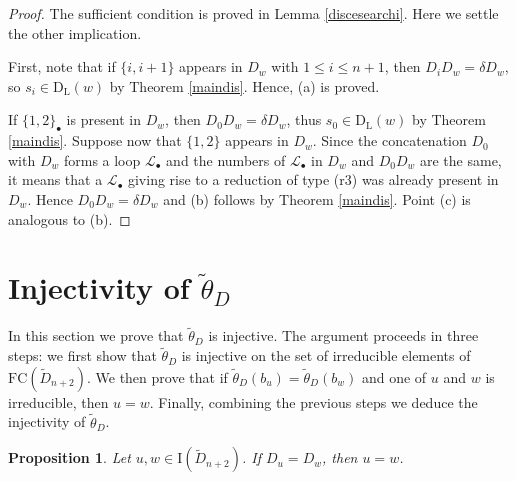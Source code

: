 \documentclass{amsart}
\newcommand{\D}{{\widetilde{D}_{n+2}}}
\newcommand{\ld}{{\mathrm{D}_{\mathrm{L}}}}
\newcommand{\fc}{{\mathrm{FC}}}
\newcommand{\bO}{{\mathcal{L}_{\bullet}}}
\newcommand{\I}{\mathrm{I}}
\newtheorem{Proposition}[Theorem]{Proposition}
\theoremstyle{definition}
\begin{document}
\begin{proof}
The sufficient condition is proved in Lemma \ref{discesearchi}. Here we settle the other implication.

First, note that if $\{i,i+1\}$ appears in $D_w$ with $1\le i\le n+1$, then $D_iD_w=\delta D_w$, so $s_i\in \ld(w)$ by Theorem \ref{maindis}. Hence, (a) is proved. 

If $\{1,2\}_{\bullet}$ is present in $D_w$, then $D_0D_w=\delta D_w$, thus $s_0\in \ld(w)$ by Theorem \ref{maindis}. Suppose now that $\{1,2\}$ appears in $D_w$. Since the concatenation $D_0$ with $D_w$ forms a loop $\bO$ and the numbers of $\bO$ in $D_w$ and $D_{0}D_{w}$ are the same, it means that a $\bO$ giving rise to a reduction of type (r3) was already present in $D_w$. Hence $D_0D_w=\delta D_w$ and (b) follows by Theorem \ref{maindis}. Point (c) is analogous to (b).
\end{proof}




\section{Injectivity of $\widetilde{\theta}_D$}\label{sec:injectivity}
In this section we prove that $\widetilde{\theta}_D$ is injective. The argument proceeds in three steps:
we first show that $\widetilde{\theta}_D$ is injective on the set of irreducible elements of 
$\fc(\D).$
We then prove that if $\widetilde{\theta}_D(b_u)=\widetilde{\theta}_D(b_w)$ and one of $u$ and $w$ is irreducible, then $u=w$.
Finally, combining the previous steps we deduce the injectivity of $\widetilde{\theta}_D$.

\begin{Proposition}
\label{inietirr}
Let $u,w \in \I(\D)$. If $D_u=D_w$, then $u=w$.
\end{Proposition}
\end{document}

